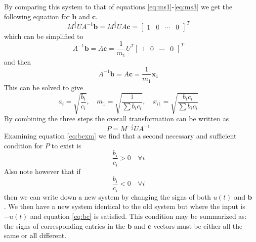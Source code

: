 \documentclass{mbd_fullpaper}
\begin{document}
By comparing this system to that of equations \ref{eq:ms1}-\ref{eq:ms3} we get the following equation for $\mathbf{b}$ and $\mathbf{c}$.
\begin{equation}
M^{\frac{1}{2}} U A^{-1} \mathbf{b} = M^{\frac{1}{2}} U A \mathbf{c} = \begin{bmatrix} 1 &  0 & \cdots & 0 \end{bmatrix}^T
\label{eq:bhat}
\end{equation}
which can be simplified to
\begin{equation}
A^{-1} \mathbf{b} = A \mathbf{c} = \frac{1}{m_1} U^T \begin{bmatrix} 1 &  0 & \cdots & 0 \end{bmatrix}^T
\label{eq:bc1}
\end{equation}
and then
\begin{equation}
A^{-1} \mathbf{b} = A \mathbf{c} = \frac{1}{m_1} \mathbf{x}_1
\label{eq:bc2}
\end{equation}
This can be solved to give
\begin{equation}
a_i = \sqrt{\frac{b_i}{c_i}} ,\quad m_1 = \sqrt{\frac{1}{\sum b_i c_i}} ,\quad x_{i1} = \sqrt{\frac{b_i c_i}{\sum b_i c_i}}
\label{eq:bcxm}
\end{equation}
By combining the three steps the overall transformation can be written as
\begin{equation}
P =  M^{-\frac{1}{2}} U A^{-1}
\label{eq:p}
\end{equation}
Examining equation \ref{eq:bcxm} we find that a second necessary and sufficient condition for $P$ to exist is
\begin{equation}
\frac{b_i}{c_i} > 0 \quad \forall i
\label{eq:bc1}
\end{equation}
Also note however that if
\begin{equation}
\frac{b_i}{c_i} < 0 \quad \forall i
\label{eq:bc2}
\end{equation}
then we can write down a new system by changing the signs of both $u(t)$ and $\mathbf{b}$. We then have a new system identical to the old system but where the input is $-u(t)$ and equation \ref{eq:bc} is satisfied.
This condition may be summarized as: the signs of corresponding entries in the $\mathbf{b}$ and $\mathbf{c}$ vectors must be either all the same or all different.
\end{document}
